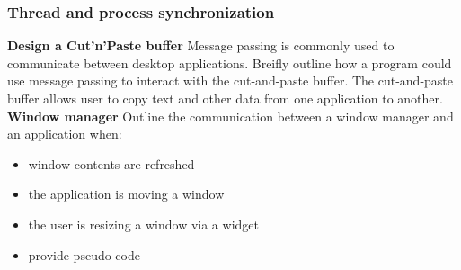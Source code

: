 
\subsubsection*{Thread and process synchronization}
\textbf{Design a Cut'n'Paste buffer}
Message passing is commonly used to communicate between desktop applications. Breifly outline how a program could use message passing to interact with the cut-and-paste buffer. The cut-and-paste buffer allows user to copy text and other data from one application to another.\\

\textbf{Window manager}
Outline the communication between a window manager and an application when:
\begin{itemize}
\item window contents are refreshed
\item the application is moving a window
\item the user is resizing a window via a widget
\item provide pseudo code
\end{itemize}

